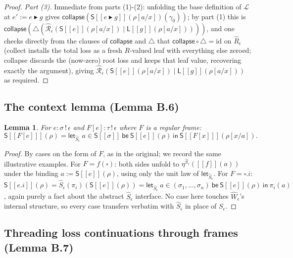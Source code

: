 \documentclass[11pt]{article}
\theoremstyle{plain}
\newtheorem{lemma}[theorem]{Lemma}
\newcommand{\Ssem}[1]{\mathsf{S}[\![#1]\!]}
\newcommand{\Lsem}[1]{\mathsf{L}[\![#1]\!]}
\newcommand{\Rm}[1]{\widehat{R}_{#1}}
\newcommand{\eps}{\epsilon}
\newcommand{\then}{\mathrel{\blacktriangleright}}
\newcommand{\collect}{\triangle}
\newcommand{\collapse}{\mathsf{collapse}}
\newcommand{\Rx}[1]{\widehat{\mathcal R}_{#1}}
\begin{document}
\begin{proof}
\emph{Part (3).} Immediate from parts (1)-(2): unfolding the base definition of $\mathcal L$ at
$e' := e\then g$ gives $\collapse(\Ssem{e\then g}(\rho[a/x])(\gamma_0))$; by part (1) this is
$\collapse(\collect(\Rx\eps(\Ssem e(\rho[a/x])\mid\Lsem g(\rho[a/x]))))$, and one checks directly
from the clauses of $\collapse$ and $\collect$ that $\collapse\circ\collect = \mathrm{id}$ on
$\Rm\eps$ (collect installs the total loss as a fresh $R$-valued leaf with everything else
zeroed; collapse discards the (now-zero) root loss and keeps that leaf value, recovering exactly
the argument), giving $\Rx\eps(\Ssem e(\rho[a/x])\mid\Lsem g(\rho[a/x]))$ as required.
\end{proof}

\subsection{The context lemma (Lemma B.6)}

\begin{lemma}
For $e:\sigma\,!\,\eps$ and $F[e]:\tau\,!\,\eps$ where $F$ is a regular frame:
\[
  \Ssem{F[e]}(\rho) = \mathsf{let}_{\widehat S_\eps}\ a\in\Ssem\sigma\ \mathsf{be}\ \Ssem{e}(\rho)\ \mathsf{in}\ \Ssem{F[x]}(\rho[x/a]).
\]
\end{lemma}
\begin{proof}
By cases on the form of $F$, as in the original; we record the same illustrative examples. For
$F=f(\square)$: both sides unfold to $\eta^{\widehat S_\eps}([\![f]\!](a))$ under the binding
$a:=\Ssem e(\rho)$, using only the unit law of $\mathsf{let}_{\widehat S_\eps}$. For $F=\square.i$:
$\Ssem{e.i}(\rho) = \widehat S_\eps(\pi_i)(\Ssem e(\rho)) = \mathsf{let}_{\widehat S_\eps}\ a\in(\sigma_1,\dots,\sigma_n)\
\mathsf{be}\ \Ssem e(\rho)\ \mathsf{in}\ \pi_i(a)$, again purely a fact about the abstract
$\widehat S_\eps$ interface. No case here touches $\widehat W_\eps$'s internal structure, so
every case transfers verbatim with $\widehat S_\eps$ in place of $S_\eps$.
\end{proof}

\subsection{Threading loss continuations through frames (Lemma B.7)}
\end{document}
